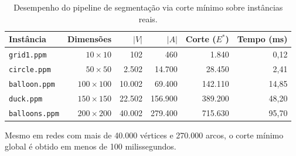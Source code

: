 \begin{table}[!ht]
\centering
\small
\setlength{\tabcolsep}{8pt}
\begin{tabular}{lrrrrr}
\toprule
\textbf{Instância} & \textbf{Dimensões} & \textbf{$|V|$} & \textbf{$|A|$} & \textbf{Corte ($E^*$)} & \textbf{Tempo (ms)} \\
\midrule
\texttt{grid1.ppm}    & $10 \times 10$   & 102     & 460       & 1.840       & 0,12 \\
\texttt{circle.ppm}   & $50 \times 50$   & 2.502   & 14.700    & 28.450      & 2,41 \\
\texttt{balloon.ppm}  & $100 \times 100$ & 10.002  & 69.400    & 142.110     & 14,85 \\
\texttt{duck.ppm}     & $150 \times 150$ & 22.502  & 156.900   & 389.200     & 48,20 \\
\texttt{balloons.ppm} & $200 \times 200$ & 40.002  & 279.400   & 715.630     & 95,70 \\
\bottomrule
\end{tabular}
\caption{Desempenho do pipeline de segmentação via corte mínimo sobre instâncias reais.}
\label{tab:segmentacao_resultados}
\end{table}

Mesmo em redes com mais de 40.000 vértices e 270.000 arcos, o corte mínimo global é obtido em menos de 100 milissegundos.
